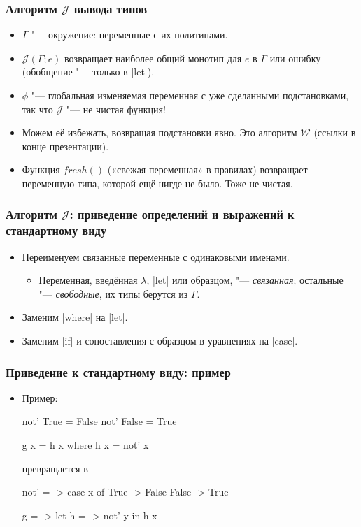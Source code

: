 \documentclass[11pt]{beamer}
\newcommand{\fresh}{\mathord{\mathit{fresh}}()}
\newcommand{\J}{\mathcal{J}}
\begin{document}
\begin{frame}[fragile]
  \frametitle{Алгоритм $\J$ вывода типов}
  \begin{itemize}
    \item $\Gamma$ "--- окружение: переменные с их политипами.
    \item $\J(\Gamma; e)$ возвращает наиболее общий монотип для $e$ в $\Gamma$ или ошибку (обобщение "--- только в \haskinline|let|).
          \pause
    \item $\phi$ "--- глобальная изменяемая переменная с уже сделанными подстановками, так что $\J$ "--- не чистая функция!\pause
    \item Можем её избежать, возвращая подстановки явно. Это алгоритм $\mathcal{W}$ (ссылки в конце презентации).
    \item Функция $\fresh$ («свежая переменная» в правилах) возвращает переменную типа, которой ещё нигде не было. Тоже не чистая.
  \end{itemize}
\end{frame}

\begin{frame}[fragile]
  \frametitle{Алгоритм $\J$: приведение определений и выражений к стандартному виду}
  \begin{itemize}
    \item Переименуем связанные переменные с одинаковыми именами.
          \begin{itemize}
            \item Переменная, введённая $\lambda$, \haskinline|let| или образцом, "--- \emph{связанная}; остальные "--- \emph{свободные}, их типы берутся из $\Gamma$.
          \end{itemize}
    \item Заменим \haskinline|where| на \haskinline|let|.
    \item Заменим \haskinline|if| и сопоставления с образцом в уравнениях на \haskinline|case|.
  \end{itemize}
\end{frame}

\begin{frame}[fragile]
  \frametitle{Приведение к стандартному виду: пример}
  \begin{itemize}
    \item Пример:
          \begin{haskellsmall}
            not' True  = False
            not' False = True

            g x = h x where h x = not' x
          \end{haskellsmall}
          \pause
          превращается в
          \begin{haskellsmall}
            not' = \x -> case x of
                True  -> False
                False -> True

            g = \x -> let h = \y -> not' y in h x
          \end{haskellsmall}
  \end{itemize}
\end{frame}
\end{document}
